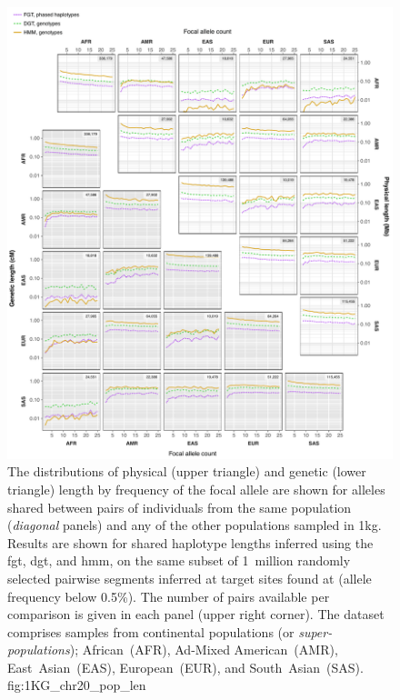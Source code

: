 

\begin{figure}[p]
\includegraphics[width=\textwidth]{./img/ch4/1KG_chr20_pop_len}
{The distributions of physical (upper triangle) and genetic (lower triangle) length by frequency of the focal allele are shown for alleles shared between pairs of individuals from the same population (\emph{diagonal} panels) and any of the other populations sampled in \gls{1kg}.
Results are shown for shared haplotype lengths inferred using the \gls{fgt}, \gls{dgt}, and \gls{hmm}, on the same subset of 1~million randomly selected pairwise segments inferred at target sites found at \fk{[2,25]} (\ie allele frequency below 0.5\%).
The number of pairs available per comparison is given in each panel (upper right corner).
The dataset comprises samples from  continental populations (or \emph{super-populations});
African~(AFR), Ad-Mixed American~(AMR), East~Asian~(EAS), European~(EUR), and South~Asian~(SAS).
\AdditionLabel}
{fig:1KG_chr20_pop_len}
\end{figure}
